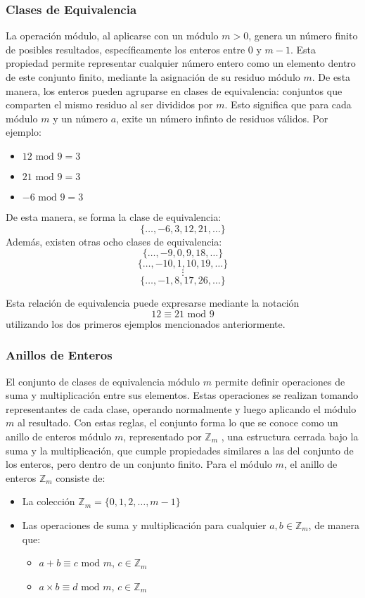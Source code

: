 \subsubsection{Clases de Equivalencia}
La operación módulo, al aplicarse con un módulo $m > 0$, genera un número finito de posibles resultados, específicamente los enteros entre $0$ y $m - 1$. Esta propiedad permite representar cualquier número entero como un elemento dentro de este conjunto finito, mediante la asignación de su residuo módulo $m$. De esta manera, los enteros pueden agruparse en clases de equivalencia: conjuntos que comparten el mismo residuo al ser divididos por $m$. 
Esto significa que para cada módulo $m$ y un número $a$, exite un número infinto de residuos válidos. Por ejemplo:
\begin{itemize}
    \item $12 \text{ mod } 9 = 3$
    \item $21 \text{ mod } 9 = 3$
    \item $-6 \text{ mod } 9 = 3$
\end{itemize}
De esta manera, se forma la clase de equivalencia:
$$ \{\dots, -6, 3, 12, 21, \dots \} $$
Además, existen otras ocho clases de equivalencia:
$$ \{\dots, -9, 0, 9, 18, \dots \} $$
$$ \{\dots, -10, 1, 10, 19, \dots \} $$
$$\vdots$$
$$ \{\dots, -1, 8, 17, 26, \dots \} $$

Esta relación de equivalencia puede expresarse mediante la notación $$ 12 \equiv 21 \text{ mod } 9 $$ utilizando los dos primeros ejemplos mencionados anteriormente.

\subsubsection{Anillos de Enteros}

El conjunto de clases de equivalencia módulo $ m $ permite definir operaciones de suma y multiplicación entre sus elementos. Estas operaciones se realizan tomando representantes de cada clase, operando normalmente y luego aplicando el módulo $ m $ al resultado. Con estas reglas, el conjunto forma lo que se conoce como un anillo de enteros módulo $ m $, representado por $ \mathbb{Z}_m$ , una estructura cerrada bajo la suma y la multiplicación, que cumple propiedades similares a las del conjunto de los enteros, pero dentro de un conjunto finito. Para el módulo $ m $, el anillo de enteros $ \mathbb{Z}_m$ consiste de:
\begin{itemize}
    \item La colección $ \mathbb{Z}_m = \{0,1,2,\dots,m-1 \}$
    \item Las operaciones de suma y multiplicación para cualquier $a,b \in \mathbb{Z}_m$, de manera que:
    \begin{itemize}
        \item $a+b \equiv c \text{ mod } m$, $c \in \mathbb{Z}_m$
        \item $a \times b \equiv d \text{ mod } m$, $c \in \mathbb{Z}_m$
    \end{itemize} 
\end{itemize}

